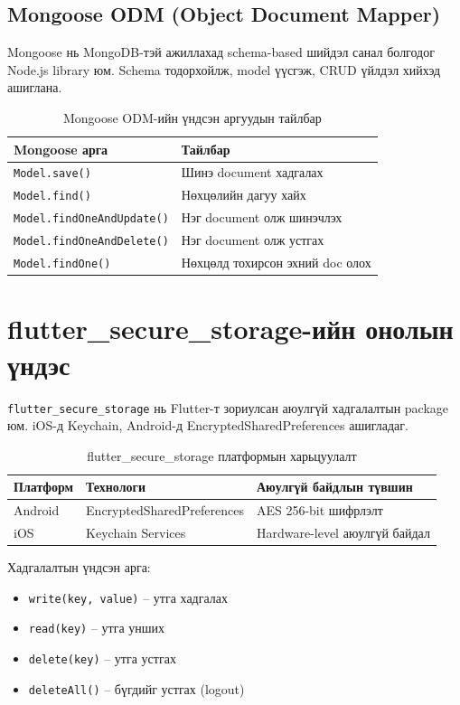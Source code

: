 \subsection{Mongoose ODM (Object Document Mapper)}

Mongoose нь MongoDB-тэй ажиллахад schema-based шийдэл санал болгодог Node.js
library юм. Schema тодорхойлж, model үүсгэж, CRUD үйлдэл хийхэд ашиглана.

\begin{longtable}{|p{4cm}|p{9cm}|}
\caption{Mongoose ODM-ийн үндсэн аргуудын тайлбар}\\
\hline
\textbf{Mongoose арга} & \textbf{Тайлбар} \\
\hline
\texttt{Model.save()} & Шинэ document хадгалах \\
\hline
\texttt{Model.find()} & Нөхцөлийн дагуу хайх \\
\hline
\texttt{Model.findOneAndUpdate()} & Нэг document олж шинэчлэх \\
\hline
\texttt{Model.findOneAndDelete()} & Нэг document олж устгах \\
\hline
\texttt{Model.findOne()} & Нөхцөлд тохирсон эхний doc олох \\
\hline
\end{longtable}

\section{flutter\_secure\_storage-ийн онолын үндэс}

\texttt{flutter\_secure\_storage} нь Flutter-т зориулсан аюулгүй хадгалалтын package юм.
iOS-д Keychain, Android-д EncryptedSharedPreferences ашигладаг.

\begin{longtable}{|p{2.8cm}|p{5.8cm}|p{5.4cm}|}
\caption{flutter\_secure\_storage платформын харьцуулалт}\\
\hline
\textbf{Платформ} & \textbf{Технологи} & \textbf{Аюулгүй байдлын түвшин} \\
\hline
Android & EncryptedShared\-Preferences & AES 256-bit шифрлэлт \\
\hline
iOS & Keychain Services & Hardware-level аюулгүй байдал \\
\hline
\end{longtable}

Хадгалалтын үндсэн арга:
\begin{itemize}
  \item \texttt{write(key, value)} -- утга хадгалах
  \item \texttt{read(key)} -- утга унших
  \item \texttt{delete(key)} -- утга устгах
  \item \texttt{deleteAll()} -- бүгдийг устгах (logout)
\end{itemize}

